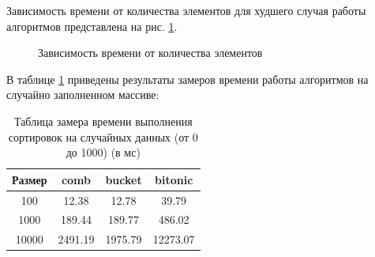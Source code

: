 \documentclass[12pt]{report}
\begin{document}
	Зависимость времени от количества элементов для худшего случая работы алгоритмов представлена на рис. \ref{ris2}.

	\begin{center}
		\begin{figure}[H]
		\center
		\caption{Зависимость времени от количества элементов}
		\label{ris2}
		\end{figure}
	\end{center}
	
	В таблице \ref{table:t3} приведены результаты замеров времени работы алгоритмов на случайно заполненном массиве:
	
	\begin{table} [h!]
		\caption{Таблица замера времени выполнения сортировок на случайных данных (от 0 до 1000) (в мс)}
		\label{table:t3}
		\begin{center}
			\begin{tabular}{|c | c | c | c|}
				
				\hline
				
				Размер & comb & bucket & bitonic  \\ [0.5ex]
				
				\hline
				
				100 & 12.38 & 12.78 & 39.79 \\ 
				
				\hline 
				
				1000 & 189.44 & 189.77 & 486.02 \\ 
				
				\hline 
				
				10000 & 2491.19 & 1975.79 & 12273.07 \\ 
				
				\hline 
				
			\end{tabular}
		\end{center}
	\end{table}
\end{document}

